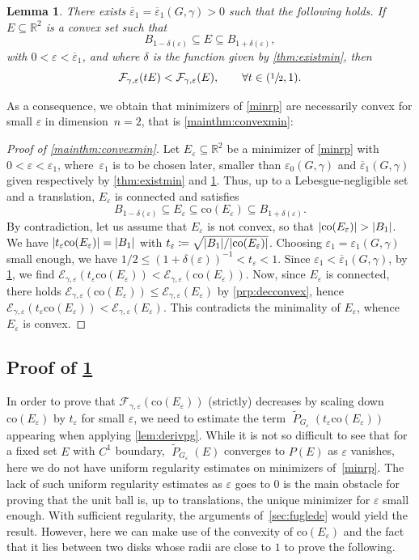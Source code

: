 \documentclass[JEP,XML,SOM,Unicode,published]{cedram}
\numberwithin{equation}{section}
\theoremstyle{plain}
\newtheorem{lem}[thm]{Lemma}
\theoremstyle{definition}
\newcommand{\numberset}[1]{{\mathbb{#1}}}
\newcommand{\R}{\numberset{R}}
\newcommand{\calE}{{\mathcal{E}}}
\newcommand{\calF}{{\mathcal{F}}}
\let\eps\varepsilon
\let\ol\overline
\let\wt\widetilde
\newcommand{\co}{{\mathrm{co}}}
\newcommand{\subsq}{\subseteq}
\DeclareMathOperator{\Per}{\mathit{P}}
\DeclarePairedDelimiter{\abs}{\lvert}{\rvert}
\begin{document}
\begin{lem}\label{lem:decconvscale}
There exists $\ol{\eps}_1=\ol{\eps}_1(G,\gamma)>0$ such that the following holds.
If $E\subsq\R^2$ is a convex set such that
\[
B_{1-\delta(\eps)} \subsq E \subsq B_{1+\delta(\eps)},
\]
with $0<\eps<\ol{\eps}_1$, and where $\delta$ is the function given by \cref{thm:existmin}, then
\[
\calF_{\gamma,\eps}(tE)< \calF_{\gamma,\eps}(E),\qquad\forall t\in({\textstyle\sfrac{1}{2}},1).
\]
\end{lem}

As a consequence, we obtain that minimizers of \cref{minrp} are necessarily convex for small $\eps$
in \mbox{dimension $n=2$}, that is \cref{mainthm:convexmin}:

\begin{proof}[Proof of {\cref{mainthm:convexmin}}]
Let $E_\eps\subsq\R^2$ be a minimizer of \cref{minrp} with $0<\eps<\eps_1$, where~$\eps_1$ is
to be chosen later, smaller than $\eps_0(G,\gamma)$ and $\ol{\eps}_1(G,\gamma)$ given respectively
by \cref{thm:existmin} and \cref{lem:decconvscale}. Thus, up to a Lebesgue-negligible set and a
translation, $E_\eps$ is connected and satisfies
\[
B_{1-\delta(\eps)}\subsq E_\eps\subsq \co(E_\eps)\subsq B_{1+\delta(\eps)}.
\]
By contradiction, let us assume that $E_\eps$ is not convex, so that $\abs{\co(E_\eps)}>\abs{B_1}$.
We have ${\abs{t_\eps\co(E_\eps)}=\abs{B_1}}$ with
$t_\eps\coloneqq\sqrt{\abs{B_1}/\abs{\co(E_\eps)}}$. Choosing $\eps_1=\eps_1(G,\gamma)$ small
enough, we have $1/2\leq(1+\delta(\eps))^{-1}<t_\eps<1$. Since $\eps_1<\ol{\eps}_1(G,\gamma)$, by
\cref{lem:decconvscale}, we find
$\calE_{\gamma,\eps}(t_\eps\co(E_\eps))<\calE_{\gamma,\eps}(\co(E_\eps))$.
Now, since $E_\eps$ is connected, there holds
$\calE_{\gamma,\eps}(\co(E_\eps))\leq\calE_{\gamma,\eps}(E_\eps)$ by \cref{prp:decconvex}, hence
$\calE_{\gamma,\eps}(t_\eps\co(E_\eps))<\calE_{\gamma,\eps}(E_\eps)$. This contradicts the
minimality of $E_\eps$, whence $E_\eps$ is convex.
\end{proof}

\subsection{Proof of \texorpdfstring{{\cref{lem:decconvscale}}}{Lemma 3.8}}
In order to prove that $\calF_{\gamma,\eps}(\co(E_\eps))$ (strictly) decreases by scaling
down~$\co(E_\eps)$ by $t_\eps$ for small $\eps$, we need to estimate the term
$\wt{\Per}_{G_\eps}(t_\eps\co(E_\eps))$ appearing when applying \cref{lem:derivpg}.
While it is not so difficult to see that for a fixed set $E$ with $C^1$ boundary,
$\wt{\Per}_{G_\eps}(E)$ converges to $P(E)$ as $\eps$ vanishes, here we do not have uniform
regularity estimates on minimizers of~\cref{minrp}. The lack of such uniform regularity
estimates as $\eps$ goes to $0$ is the main obstacle for proving that the unit ball is, up to
translations, the unique minimizer for $\eps$ small enough. With sufficient regularity, the
arguments of~\cref{sec:fuglede} would yield the result.
However, here we can make use of the convexity of $\co(E_\eps)$ and the fact that it lies between two
disks whose radii are close to $1$ to prove the following.
\end{document}
